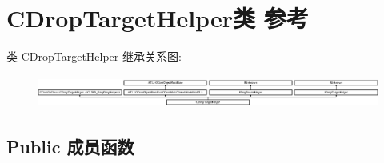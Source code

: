 \hypertarget{class_c_drop_target_helper}{}\section{C\+Drop\+Target\+Helper类 参考}
\label{class_c_drop_target_helper}
类 C\+Drop\+Target\+Helper 继承关系图\+:\begin{figure}[H]
\begin{center}
\leavevmode
\includegraphics[height=1.074169cm]{class_c_drop_target_helper}
\end{center}
\end{figure}
\subsection*{Public 成员函数}
